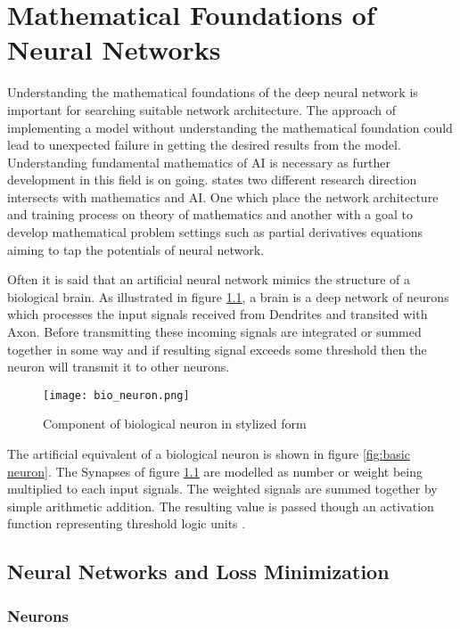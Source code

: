 \chapter{Mathematical Foundations of Neural Networks} \label{ch:math-behid}

Understanding the mathematical foundations of the deep neural network is important for searching suitable network architecture. The approach of implementing a model without understanding the mathematical foundation could lead to unexpected failure in getting the desired results from the model. Understanding fundamental mathematics of \acl{AI} is necessary as further development in this field is on going.   \parencite{Kutyniok.16032022} states two different research direction intersects with mathematics and \acl{AI}. One which place the network architecture and training process on theory of mathematics and another with a goal to develop  mathematical problem settings such as partial derivatives equations aiming to tap the potentials of neural network.

Often it is said that an artificial neural network mimics the structure of a biological brain. As illustrated in figure \ref{fig:bio neuron}, a brain is a deep network of neurons which processes the input signals received from Dendrites and transited with Axon. Before transmitting these incoming signals are integrated or summed together in some way and if resulting signal exceeds some threshold then the neuron will transmit it to other neurons.   
\begin{figure}[H]
    \centering    
    \texttt{[image: bio\_neuron.png]}
    \caption{Component of biological neuron in stylized form \parencite[section 1.1]{Gevin.1997}}
    \label{fig:bio neuron}
\end{figure}

The artificial equivalent of a biological neuron is shown in figure  \ref{fig:basic neuron}. The Synapses of figure \ref{fig:bio neuron} are modelled as number or weight being multiplied to each input signals. The weighted signals are summed together by simple arithmetic addition. The resulting value is passed though an activation function representing threshold logic units \parencite[section 1.1]{Gevin.1997}.

\section{Neural Networks and Loss Minimization}

\subsection*{Neurons}

